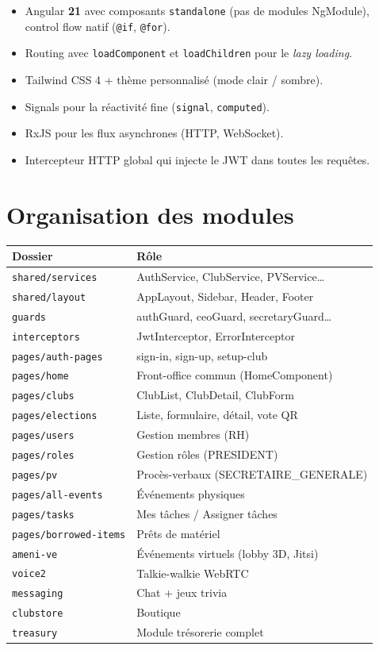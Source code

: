 \documentclass[11pt,a4paper]{report}
\begin{document}
\begin{itemize}[leftmargin=*]
  \item Angular \textbf{21} avec composants \texttt{standalone} (pas de modules
        NgModule), control flow natif (\texttt{@if}, \texttt{@for}).
  \item Routing avec \texttt{loadComponent} et \texttt{loadChildren} pour le
        \textit{lazy loading}.
  \item Tailwind CSS 4 + thème personnalisé (mode clair / sombre).
  \item Signals pour la réactivité fine (\texttt{signal}, \texttt{computed}).
  \item RxJS pour les flux asynchrones (HTTP, WebSocket).
  \item Intercepteur HTTP global qui injecte le JWT dans toutes les requêtes.
\end{itemize}

\section{Organisation des modules}

\begin{tabular}{ll}
\toprule
\textbf{Dossier} & \textbf{Rôle} \\
\midrule
\texttt{shared/services}     & AuthService, ClubService, PVService\ldots \\
\texttt{shared/layout}       & AppLayout, Sidebar, Header, Footer \\
\texttt{guards}              & authGuard, ceoGuard, secretaryGuard\ldots \\
\texttt{interceptors}        & JwtInterceptor, ErrorInterceptor \\
\texttt{pages/auth-pages}    & sign-in, sign-up, setup-club \\
\texttt{pages/home}          & Front-office commun (HomeComponent) \\
\texttt{pages/clubs}         & ClubList, ClubDetail, ClubForm \\
\texttt{pages/elections}     & Liste, formulaire, détail, vote QR \\
\texttt{pages/users}         & Gestion membres (RH) \\
\texttt{pages/roles}         & Gestion rôles (PRESIDENT) \\
\texttt{pages/pv}            & Procès-verbaux (SECRETAIRE\_GENERALE) \\
\texttt{pages/all-events}    & Événements physiques \\
\texttt{pages/tasks}         & Mes tâches / Assigner tâches \\
\texttt{pages/borrowed-items} & Prêts de matériel \\
\texttt{ameni-ve}            & Événements virtuels (lobby 3D, Jitsi) \\
\texttt{voice2}              & Talkie-walkie WebRTC \\
\texttt{messaging}           & Chat + jeux trivia \\
\texttt{clubstore}           & Boutique \\
\texttt{treasury}            & Module trésorerie complet \\
\bottomrule
\end{tabular}
\end{document}
